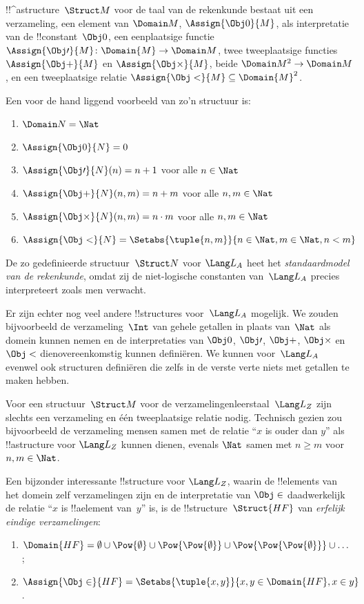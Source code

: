 \documentclass[../../../include/open-logic-section]{subfiles}
\begin{document}
\begin{ex}
!!^a{structure}~$\Struct M$ voor de taal van de rekenkunde bestaat uit
  een verzameling, een element van $\Domain M$, $\Assign{\Obj 0}{M}$,
  als interpretatie van de !!{constant}~$\Obj 0$, een eenplaatsige functie
  $\Assign{\Obj \prime}{M} \colon \Domain{M} \to \Domain M$, twee
  tweeplaatsige functies $\Assign{\Obj +}{M}$ en $\Assign{\Obj
    \times}{M}$, beide $\Domain M^2 \to \Domain M$, en een
  tweeplaatsige relatie $\Assign{\Obj <}{M} \subseteq \Domain{M}^2$.

Een voor de hand liggend voorbeeld van zo'n structuur is:
\begin{enumerate}
\item $\Domain N = \Nat$
\item $\Assign{\Obj 0}{N} = 0$
\item $\Assign{\Obj \prime}{N}(n) = n + 1$ voor alle $n \in \Nat$
\item $\Assign{\Obj +}{N}(n, m) = n + m$ voor alle $n, m \in \Nat$
\item $\Assign{\Obj \times}{N}(n, m) = n\cdot m$ voor alle $n, m \in \Nat$
\item $\Assign{\Obj <}{N} = \Setabs{\tuple{n, m}}{n \in \Nat, m \in
  \Nat, n < m}$
\end{enumerate}
De zo gedefinieerde structuur~$\Struct N$ voor $\Lang L_A$ heet het
\emph{standaardmodel van de rekenkunde}, omdat zij de niet-logische
constanten van~$\Lang L_A$ precies interpreteert zoals men verwacht.

Er zijn echter nog veel andere !!{structure}s voor~$\Lang L_A$
mogelijk. We zouden bijvoorbeeld de verzameling~$\Int$ van gehele
getallen in plaats van~$\Nat$ als domein kunnen nemen en de
interpretaties van $\Obj 0$, $\Obj \prime$, $\Obj +$, $\Obj \times$ en
$\Obj <$ dienovereenkomstig kunnen definiëren. We kunnen voor~$\Lang
L_A$ evenwel ook structuren definiëren die zelfs in de verste verte
niets met getallen te maken hebben.
\end{ex}

\begin{ex}
Voor een structuur~$\Struct M$ voor de verzamelingenleerstaal~$\Lang
L_Z$ zijn slechts een verzameling en één tweeplaatsige relatie nodig.
Technisch gezien zou bijvoorbeeld de verzameling mensen samen met de
relatie ``$x$ is ouder dan $y$'' als !!a{structure} voor $\Lang L_Z$
kunnen dienen, evenals $\Nat$ samen met $n \ge m$ voor $n, m \in \Nat$.

Een bijzonder interessante !!{structure} voor $\Lang L_Z$, waarin de
!!{element}s van het domein zelf verzamelingen zijn en de interpretatie
van $\Obj \in$ daadwerkelijk de relatie ``$x$ is !!a{element} van~$y$''
is, is de !!{structure}~$\Struct{{HF}}$ van \emph{erfelijk eindige
verzamelingen}:
\begin{enumerate}
\item $\Domain{{{HF}}} = \emptyset \cup \Pow{\emptyset} \cup
  \Pow{\Pow{\emptyset}} \cup \Pow{\Pow{\Pow{\emptyset}}} \cup \dots$;
\item $\Assign{\Obj \in}{{{HF}}} = \Setabs{\tuple{x, y}}{x, y \in
  \Domain{{{HF}}}, x \in y}$.
\end{enumerate}
\end{ex}
\end{document}

